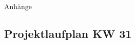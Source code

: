 %
%
%
\begin{appendix}

\newpage

\begin{center}
	\huge{Anhänge}
\end{center}

\normalsize

%

\newpage
\begin{landscape}
	\section{Projektlaufplan KW 31}
	\label{sec:projectplan}
	\scalebox{.75}{
		
		}
\end{landscape}


\end{appendix}
